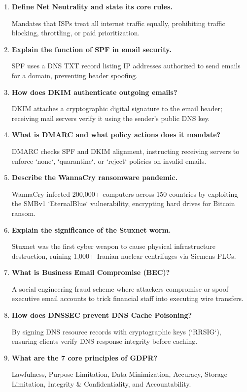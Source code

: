 \documentclass[12pt,a4paper]{article}
\newcommand{\Q}[1]{\textbf{#1}\par\noindent\ignorespaces}
\begin{document}
\begin{tcolorbox}[exambox, title={\textbf{Frequently Asked / Viva Questions}}]
\begin{enumerate}[leftmargin=*, label=\textbf{Q\arabic*.}, itemsep=5pt, topsep=0pt]
  \item \Q{Define Net Neutrality and state its core rules.}
        Mandates that ISPs treat all internet traffic equally, prohibiting traffic blocking, throttling, or paid prioritization.

  \item \Q{Explain the function of SPF in email security.}
        SPF uses a DNS TXT record listing IP addresses authorized to send emails for a domain, preventing header spoofing.

  \item \Q{How does DKIM authenticate outgoing emails?}
        DKIM attaches a cryptographic digital signature to the email header; receiving mail servers verify it using the sender's public DNS key.

  \item \Q{What is DMARC and what policy actions does it mandate?}
        DMARC checks SPF and DKIM alignment, instructing receiving servers to enforce `none`, `quarantine`, or `reject` policies on invalid emails.

  \item \Q{Describe the WannaCry ransomware pandemic.}
        WannaCry infected 200,000+ computers across 150 countries by exploiting the SMBv1 `EternalBlue` vulnerability, encrypting hard drives for Bitcoin ransom.

  \item \Q{Explain the significance of the Stuxnet worm.}
        Stuxnet was the first cyber weapon to cause physical infrastructure destruction, ruining 1,000+ Iranian nuclear centrifuges via Siemens PLCs.

  \item \Q{What is Business Email Compromise (BEC)?}
        A social engineering fraud scheme where attackers compromise or spoof executive email accounts to trick financial staff into executing wire transfers.

  \item \Q{How does DNSSEC prevent DNS Cache Poisoning?}
        By signing DNS resource records with cryptographic keys (`RRSIG`), ensuring clients verify DNS response integrity before caching.

  \item \Q{What are the 7 core principles of GDPR?}
        Lawfulness, Purpose Limitation, Data Minimization, Accuracy, Storage Limitation, Integrity \& Confidentiality, and Accountability.


\end{enumerate}
\end{tcolorbox}
\end{document}
